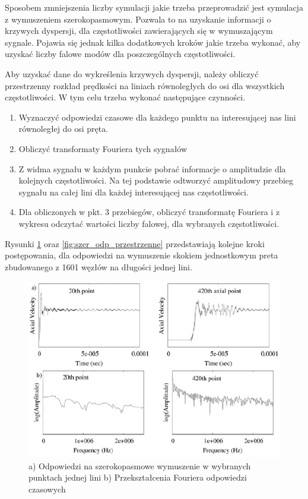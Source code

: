 \vspace{3mm}

Sposobem zmniejszenia liczby symulacji jakie trzeba przeprowadzić jest symulacja z wymuszeniem szerokopasmowym. Pozwala to na uzyskanie informacji o krzywych dyspersji, dla częstotliwości zawierających się w wymuszającym sygnale. Pojawia się jednak kilka dodatkowych kroków jakie trzeba wykonać, aby uzyskać liczby falowe modów dla poszczególnych częstotliwości.

Aby uzyskać dane do wykreślenia krzywych dyspersji, należy obliczyć przestrzenny rozkład prędkości na liniach równoległych do osi dla wszystkich częstotliwości. W tym celu trzeba wykonać następujące czynności.

\begin{enumerate}
  \item Wyznaczyć odpowiedzi czasowe dla każdego punktu na interesującej nas lini równoległej do osi pręta.
  \item Obliczyć transformaty Fouriera tych sygnałów
  \item Z widma sygnału w każdym punkcie pobrać informacje o amplitudzie dla kolejnych częstotliwości. Na tej podstawie odtworzyć amplitudowy przebieg sygnału na całej lini dla każdej interesującej nas częstotliwości.
  \item Dla obliczonych w pkt. 3 przebiegów, obliczyć transformatę Fouriera i z wykresu odczytać wartości liczby falowej, dla wybranych częstotliwości.
\end{enumerate}

Rysunki \ref{fig:szer_odp_czasowe} oraz \ref{fig:szer_odp_przestrzenne} przedstawiają kolejne kroki postępowania, dla odpowiedzi na wymuszenie skokiem jednostkowym preta zbudowanego z 1601 węzłów na długości jednej lini. 

\begin{figure}[h]
\centering
\includegraphics[width=15cm]{Zdjecia/2/widmo_wymuszenia_szerokopasmowe1a}
\caption{a) Odpowiedzi na szerokopasmowe wymuszenie w wybranych punktach jednej lini b) Przekształcenia Fouriera odpowiedzi czasowych \cite{bartek_valsamos}}
\label{fig:szer_odp_czasowe}
\end{figure}

